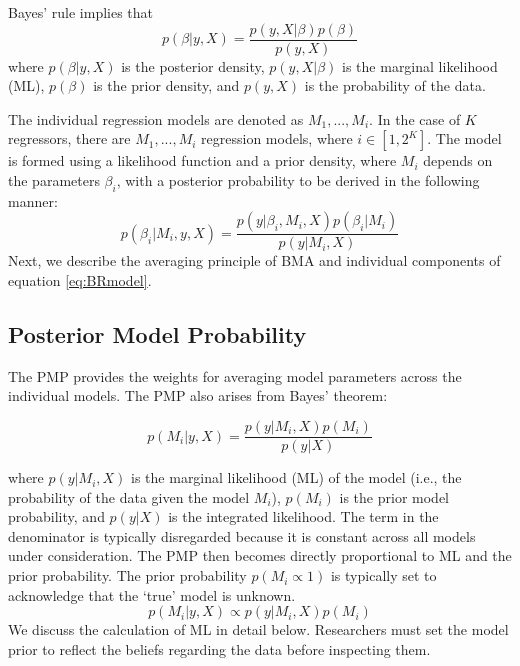\documentclass[a4paper,11pt]{article}
\begin{document}
Bayes' rule implies that
%
\begin{equation}\label{eq:BRmodel}
p(\beta \vert y,X) = \frac{p(y,X\vert \beta)p(\beta)}{p(y,X)}
\end{equation}
where $p(\beta \vert y, X)$ is the posterior density, $p(y, X\vert \beta)$ is the marginal likelihood (ML), $p(\beta)$ is the prior density, and $p(y,X)$ is the probability of the data. 

The individual regression models are denoted as $M_{1},...,M_{i}$. In the case of $K$ regressors, there are $M_{1},...,M_{i}$ regression models, where $i \in [1,2^{K}]$. The model is formed using a likelihood function and a prior density, where $M_{i}$ depends on the parameters $\beta_{i}$, with a posterior probability to be derived in the following manner:
\begin{equation}\label{eq:BROM}
p(\beta_{i} \vert M_{i},y,X) = \frac{p(y\vert \beta_{i},M_{i},X)p(\beta_{i}\vert M_{i})}{p(y \vert M_{i},X)}
\end{equation}
Next, we describe the averaging principle of \ac{BMA} and individual components of equation \ref{eq:BRmodel}.
%
\subsection*{Posterior Model Probability}
%
The \ac{PMP} provides the weights for averaging model parameters across the individual models. The \ac{PMP} also arises from Bayes' theorem:

\begin{equation}\label{eq:PMPmain}
p(M_{i} \vert y,X) = \frac{p(y\vert M_{i},X)p(M_{i})}{p(y \vert X)}
\end{equation}

where $p(y\vert M_{i},X)$ is the marginal likelihood (ML) of the model (i.e., the probability of the data given the model $M_{i}$), $p(M_{i})$ is the prior model probability, and $p(y\vert X)$ is the integrated likelihood. The term in the denominator is typically disregarded because it is constant across all models under consideration. The \ac{PMP} then becomes directly proportional to ML and the prior probability. The prior probability $p(M_{i} \propto 1)$ is typically set to acknowledge that the `true' model is unknown.
\begin{equation}
p(M_{i}\vert y,X) \propto p(y\vert M_{i},X)p(M_{i})
\end{equation}
%
We discuss the calculation of ML in detail below. Researchers must set the model prior to reflect the beliefs regarding the data before inspecting them. 
%
\end{document}
